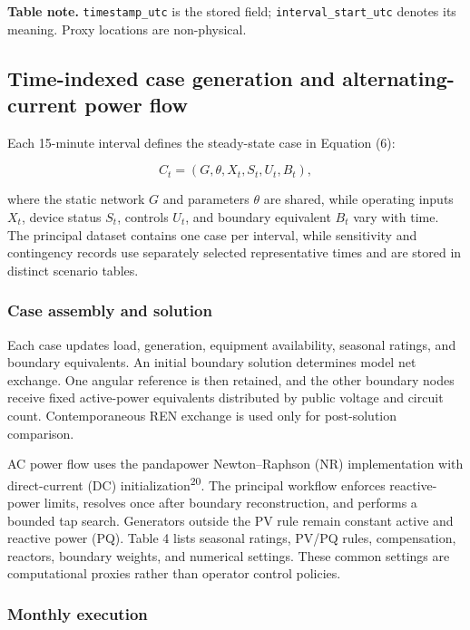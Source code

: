 \documentclass[
  10pt]{article}
\begin{document}
\textbf{Table note.} \texttt{timestamp\_utc} is the stored field;
\texttt{interval\_start\_utc} denotes its meaning. Proxy locations are
non-physical.

\subsection{Time-indexed case generation and alternating-current power
flow}\label{time-indexed-case-generation-and-alternating-current-power-flow}

Each 15-minute interval defines the steady-state case in Equation (6):

\[
C_t=(G,\theta,X_t,S_t,U_t,B_t), \tag{6}\label{eq:case-definition}
\]

where the static network \(G\) and parameters \(\theta\) are shared,
while operating inputs \(X_t\), device status \(S_t\), controls \(U_t\),
and boundary equivalent \(B_t\) vary with time. The principal dataset
contains one case per interval, while sensitivity and contingency
records use separately selected representative times and are stored in
distinct scenario tables.

\subsubsection{Case assembly and
solution}\label{case-assembly-and-solution}

Each case updates load, generation, equipment availability, seasonal
ratings, and boundary equivalents. An initial boundary solution
determines model net exchange. One angular reference is then retained,
and the other boundary nodes receive fixed active-power equivalents
distributed by public voltage and circuit count. Contemporaneous REN
exchange is used only for post-solution comparison.

AC power flow uses the pandapower Newton--Raphson (NR) implementation
with direct-current (DC) initialization\textsuperscript{20}. The
principal workflow enforces reactive-power limits, resolves once after
boundary reconstruction, and performs a bounded tap search. Generators
outside the PV rule remain constant active and reactive power (PQ).
Table 4 lists seasonal ratings, PV/PQ rules, compensation, reactors,
boundary weights, and numerical settings. These common settings are
computational proxies rather than operator control policies.

\subsubsection{Monthly execution}\label{monthly-execution}
\end{document}
